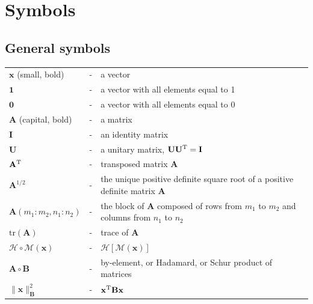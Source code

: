 \documentclass[11pt]{report}
\newcommand{\mb} {\mathbf}
\newcommand{\T}{^{\tiny \mathrm T}}
\begin{document}
\clearpage

\chapter*{Symbols}

\section*{General symbols}
\begin{tabular}{lll}
  $\mb x$ (small, bold) &-& a vector \\
  $\mb 1$ &-& a vector with all elements equal to 1 \\
  $\mb 0$ &-& a vector with all elements equal to 0 \\
  $\mb A$ (capital, bold) &-& a matrix \\
  $\mb I$ &-& an identity matrix \\
  $\mb U$ &-& a unitary matrix, $\mb U \mb U\T = \mb I$ \\
  $\mb A\T$ &-& transposed matrix $\mb A$ \\
  $\mb A^{1/2}$ &-& the unique positive definite square root of a positive definite matrix $\mb A$ \\
  $\mb A(m_1 : m_2, n_1 : n_2)$ &-& the block of $\mb A$ composed of rows from $m_1$ to $m_2$ and columns from $n_1$ to $n_2$\\
  $\mathrm{tr}(\mb A)$ &-& trace of $\mb A$ \\
  $\mathcal H \circ \mathcal M(\mb x)$ &-& $\mathcal H \left[ \mathcal M (\mb x) \right]$ \\
  $\mb A \circ \mb B$ &-& by-element, or Hadamard, or Schur product of matrices\\
  $\|\mb x\|^2_{\mb B }$ &-& $ \mb x\T \mb B \mb x$
  \end{tabular}
\end{document}
